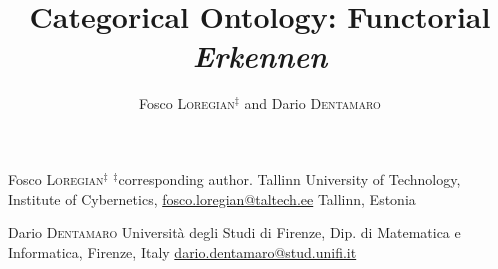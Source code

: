 \documentclass[a4paper,9pt]{../birkjour}
\title{Categorical Ontology: Functorial \emph{Erkennen}}
\author{Fosco \textsc{Loregian}$^\ddag$ and Dario \textsc{Dentamaro}}
\begin{document}
\scriptsize

\maketitle

\begin{minipage}{.4\textwidth}
  Fosco \textsc{Loregian}$^\ddag$\newline 
  $^\ddag$corresponding author. \newline 
Tallinn University of Technology,\newline %
Institute of Cybernetics,\newline 
\url{fosco.loregian@taltech.ee}
Tallinn, Estonia 
\end{minipage}\hfill %
\begin{minipage}{.4\textwidth}
  Dario \textsc{Dentamaro} \newline 
  Università degli Studi di Firenze,\newline 
  Dip. di Matematica e Informatica, \newline 
  Firenze, Italy\newline
  \url{dario.dentamaro@stud.unifi.it}
\end{minipage}
\end{document}
